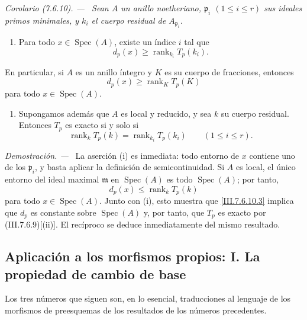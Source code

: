 \documentclass[10pt,oneside]{book}
\newcommand{\Spec}{\operatorname{Spec}}
\newcommand{\sref}[2][]{\textup{(#2)}}
\newcommand{\oldpage}[2][]{\setcounter{footnote}{0}\marginpar{\scriptsize\textbf{#1}~|~#2}\ignorespaces}
\newenvironment{corollary}[1][]{\par\medskip\noindent\itshape Corolario (#1). ---\ }{\par}
\newenvironment{proof}{\par\medskip\noindent\textit{Demostración. ---\ }}{\par}
\begin{document}
\begin{corollary}[7.6.10]
\label{III.7.6.10}
Sean $A$ un anillo noetheriano, $\mathfrak p_i$ $(1\leq i\leq r)$
sus ideales primos minimales, y $k_i$ el cuerpo residual de
$A_{\mathfrak p_i}$.
\begin{enumerate}
  \item[\textup{(i)}] Para todo $x\in\Spec(A)$, existe un índice $i$ tal que
    \[
      d_p(x)\geq
      \operatorname{rank}_{k_i}T_p(k_i).
      \tag{7.6.10.1}\label{III.7.6.10.1}
    \]
\end{enumerate}
En particular, si $A$ es un anillo íntegro y $K$ es su cuerpo de
fracciones, entonces
\[
  d_p(x)\geq\operatorname{rank}_K T_p(K)
  \tag{7.6.10.2}\label{III.7.6.10.2}
\]
para todo $x\in\Spec(A)$.

\oldpage[III]{196}
\begin{enumerate}
  \item[\textup{(ii)}] Supongamos además que $A$ es local y reducido, y sea
    $k$ su cuerpo residual. Entonces $T_p$ es exacto si y solo si
    \[
      \operatorname{rank}_k T_p(k)
      =
      \operatorname{rank}_{k_i}T_p(k_i)
      \qquad(1\leq i\leq r).
      \tag{7.6.10.3}\label{III.7.6.10.3}
    \]
\end{enumerate}
\end{corollary}

\begin{proof}
La aserción \textnormal{(i)} es inmediata: todo entorno de $x$
contiene uno de los $\mathfrak p_i$, y basta aplicar la definición de
semicontinuidad. Si $A$ es local, el único entorno del ideal maximal
$\mathfrak m$ en $\Spec(A)$ es todo $\Spec(A)$; por tanto,
\[
  d_p(x)\leq\operatorname{rank}_k T_p(k)
\]
para todo $x\in\Spec(A)$. Junto con \textnormal{(i)}, esto muestra que
\eqref{III.7.6.10.3} implica que $d_p$ es constante sobre
$\Spec(A)$ y, por tanto, que $T_p$ es exacto por
\sref{III.7.6.9}[(ii)]. El recíproco se deduce inmediatamente del
mismo resultado.
\end{proof}

\egaIIISubsectionSevenSixEleven

\subsection{Aplicación a los morfismos propios: I. La propiedad de cambio de base}
\label{subsection:III.7.7}
\label{III.7.7}

Los tres números que siguen son, en lo esencial, traducciones al lenguaje de
los morfismos de preesquemas de los resultados de los números precedentes.
\end{document}
